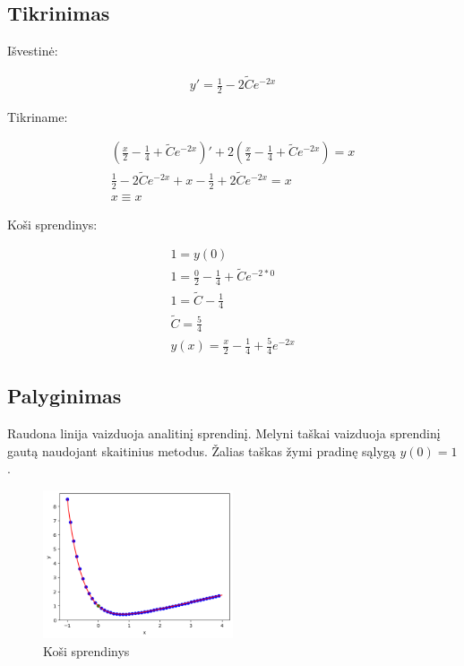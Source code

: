\documentclass[11pt]{article}
\begin{document}
\subsection{Tikrinimas}

Išvestinė:

\begin{equation}
\begin{split}
y'=\frac{1}{2}-2\widetilde{C}e^{-2x}
\end{split}
\end{equation}

Tikriname:

\begin{equation}
\begin{split}
\left(\frac{x}{2}-\frac{1}{4}+\widetilde{C}e^{-2x}\right)'+2\left(\frac{x}{2}-\frac{1}{4}+\widetilde{C}e^{-2x}\right)=x\\
\frac{1}{2}-2\widetilde{C}e^{-2x}+x-\frac{1}{2}+2\widetilde{C}e^{-2x}=x\\
x\equiv x
\end{split}
\end{equation}

Koši sprendinys:

\begin{equation}
\begin{split}
1=y(0)\\
1=\frac{0}{2}-\frac{1}{4}+\widetilde{C}e^{-2*0}\\
1=\widetilde{C}-\frac{1}{4}\\
\widetilde{C}=\frac{5}{4}\\
y(x)=\frac{x}{2}-\frac{1}{4}+\frac{5}{4}e^{-2x}
\end{split}
\end{equation}

\newpage
\subsection{Palyginimas}

Raudona linija vaizduoja analitinį sprendinį. Melyni taškai vaizduoja sprendinį gautą naudojant skaitinius metodus. Žalias taškas žymi pradinę sąlygą $y(0)=1$.

\begin{figure}[h!]
    \centering
    \includegraphics[width=0.5\textwidth]{3.png}
    \caption{Koši sprendinys}
    \label{fig:pvz3}
\end{figure}
\end{document}
